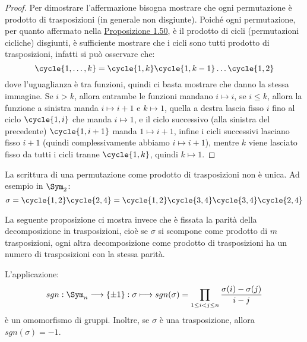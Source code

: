 \documentclass[11pt]{scrartcl}
\begin{document}
\begin{proof}
    Per dimostrare l'affermazione bisogna mostrare che ogni permutazione è prodotto di trasposizioni (in generale non disgiunte).
    Poiché ogni permutazione, per quanto affermato nella \hyperref[perm]{Proposizione 1.50}, è il prodotto di cicli (permutazioni cicliche) disgiunti,
    è sufficiente mostrare che i cicli sono tutti prodotto di trasposizioni, infatti si può osservare che:
        \[ \cycle{1,\ldots,k} = \cycle{1,k}\cycle{1,k-1}\ldots\cycle{1,2}
            \]
    dove l'uguaglianza è tra funzioni, quindi ci basta mostrare che danno la stessa immagine. Se $i>k$, allora entrambe le funzioni mandano $i \longmapsto i$, se 
    $i \leq k$, allora la funzione a sinistra manda $i \longmapsto i+1$ e $k \longmapsto 1$, quella a destra lascia fisso $i$ fino al ciclo $\cycle{1,i}$ che manda $i \longmapsto 1$,
    e il ciclo successivo (alla sinistra del precedente) $\cycle{1,i+1}$ manda $1 \longmapsto i+1$, infine i cicli successivi lasciano fisso $i+1$ (quindi complessivamente abbiamo $i \longmapsto i+1$), 
    mentre $k$ viene lasciato fisso da tutti i cicli tranne $\cycle{1,k}$, quindi $k \longmapsto 1$.
\end{proof}

\begin{remark}
    La scrittura di una permutazione come prodotto di trasposizioni non è unica. Ad esempio in $\Sym_2$:
        \[ \sigma = \cycle{1,2}\cycle{2,4} = \cycle{1,2}\cycle{3,4}\cycle{3,4}\cycle{2,4}
            \]
\end{remark}

La seguente proposizione ci mostra invece che è fissata la parità della decomposizione in trasposizioni, cioè se $\sigma$ si scompone come prodotto di $m$ trasposizioni,
ogni altra decomposizione come prodotto di trasposizioni ha un numero di trasposizioni con la stessa parità.

\begin{proposition}
    L'applicazione:
        \[ sgn : \Sym_n \longrightarrow \{\pm1\} : \sigma \longmapsto sgn(\sigma) = \prod_{1 \leq i < j \leq n} \frac{\sigma(i) - \sigma(j)}{i - j}
            \]
    è un omomorfismo di gruppi. Inoltre, se $\sigma$ è una trasposizione, allora $sgn(\sigma) = -1$.
\end{proposition}
\end{document}
